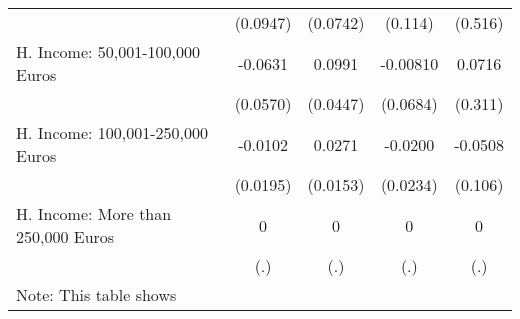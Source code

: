 {\begin{tabular}{l*{4}{c}}
            &    (0.0947)         &    (0.0742)         &     (0.114)         &     (0.516)         \\
[1em]
H. Income: 50,001-100,000 Euros&     -0.0631         &      0.0991\sym{*}  &    -0.00810         &      0.0716         \\
            &    (0.0570)         &    (0.0447)         &    (0.0684)         &     (0.311)         \\
[1em]
H. Income: 100,001-250,000 Euros&     -0.0102         &      0.0271         &     -0.0200         &     -0.0508         \\
            &    (0.0195)         &    (0.0153)         &    (0.0234)         &     (0.106)         \\
[1em]
H. Income: More than 250,000 Euros&           0         &           0         &           0         &           0         \\
            &         (.)         &         (.)         &         (.)         &         (.)         \\
\hline\hline
\multicolumn{5}{l}{\footnotesize Note: This table shows}\\
\end{tabular}
}

